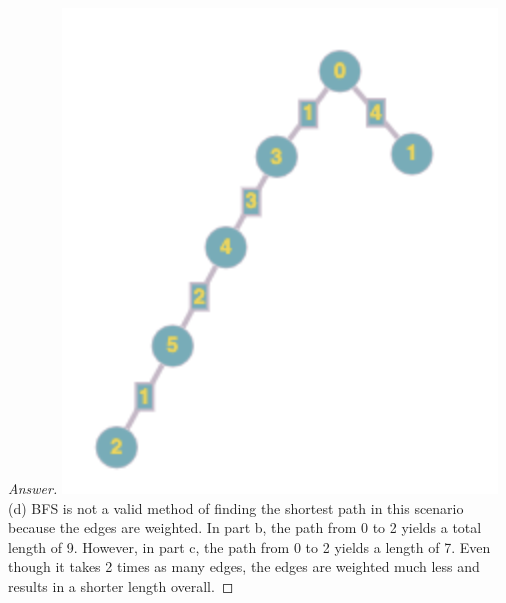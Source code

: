 \documentclass[11pt]{article}
\theoremstyle{definition}
\theoremstyle{definition}
\theoremstyle{definition}
\begin{document}
\begin{proof}[Answer]
\includegraphics[]{image8.png} \\
(d) BFS is not a valid method of finding the shortest path in this scenario because the edges are weighted. In part b, the path from 0 to 2 yields a total length of 9. However, in part c, the path from 0 to 2 yields a length of 7. Even though it takes 2 times as many edges, the edges are weighted much less and results in a shorter length overall. 
\end{proof}
\end{document}
